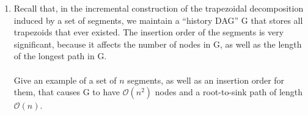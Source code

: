 \documentclass[a4paper, 8pt, oneside]{article}
\newenvironment{sol}
    {\emph{Solution:}
    }
    {
    \qed
    }
\begin{document}
\begin{enumerate}
\begin{sol}
\begin{enumerate}
\begin{minipage}{\linewidth}
        \end{minipage} \\
\end{enumerate}
Notice that we iterate over all vertices in \ref{itm:setp1} $\mathcal{O}(n)$ and iterate over the sequences in \ref{itm:setp2} $\mathcal{O}(n)$  so we get that the time complexty is $\mathcal{O}(n)$.
\end{sol}
\item Recall that, in the incremental construction of the trapezoidal decomposition induced by a set of segments, we maintain a “history DAG” G that stores all trapezoids that ever existed. The insertion order of the segments is very significant, because it affects the number of nodes in G, as well as the length of the longest path in G.\\ \\
Give an example of a set of $n$ segments, as well as an insertion order for them, that causes G to have $\mathcal{O}(n^2)$ nodes and a root-to-sink path of length $\mathcal{O}(n)$. \\


\end{enumerate}
\end{document}
